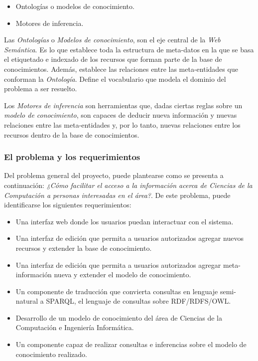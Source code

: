 \begin{itemize}
\item Ontologías o modelos de conocimiento.
\item Motores de inferencia.
\end{itemize}

Las \textit{Ontologías} o \textit{Modelos de conocimiento}, son el eje central de la \textit{Web Semántica}. Es lo que establece toda la estructura de meta-datos en la que se basa el etiquetado e indexado de los recursos que forman parte de la base de conocimientos. Además, establece las relaciones entre las meta-entidades que conforman la \textit{Ontología}. Define el vocabulario que modela el dominio del problema a ser resuelto.

Los \textit{Motores de inferencia} son herramientas que, dadas ciertas reglas sobre un \textit{modelo de conocimiento}, son capaces de deducir nueva información y nuevas relaciones entre las meta-entidades y, por lo tanto, nuevas relaciones entre los recursos dentro de la base de conocimientos.

\subsubsection{El problema y los requerimientos}
Del problema general del proyecto, puede plantearse como se presenta a continuación: \textit{¿Cómo facilitar el acceso a la información acerca de Ciencias de la Computación a personas interesadas en el área?}. De este problema, puede identificarse los siguientes requerimientos:

\begin{itemize}
\item Una interfaz web donde los usuarios puedan interactuar con el sistema.
\item Una interfaz de edición que permita a usuarios autorizados agregar nuevos recursos y extender la base de conocimiento.
\item Una interfaz de edición que permita a usuarios autorizados agregar meta-información nueva y extender el modelo de conocimiento.
\item Un componente de traducción que convierta consultas en lenguaje semi-natural a SPARQL, el lenguaje de consultas sobre RDF/RDFS/OWL.
\item Desarrollo de un modelo de conocimiento del área de Ciencias de la Computación e Ingeniería Informática.
\item Un componente capaz de realizar consultas e inferencias sobre el modelo de conocimiento realizado.
\end{itemize}

